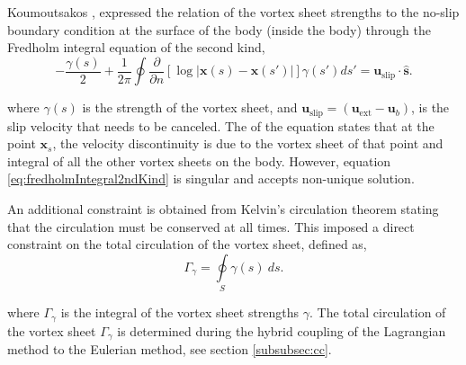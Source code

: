 Koumoutsakos \cite{Koumoutsakos1993b}, expressed the relation of the vortex sheet strengths to the no-slip boundary condition at the surface of the body (inside the body) through the Fredholm integral equation of the second kind,
	\begin{equation}
	-\frac{\gamma\left(s\right)}{2} + \frac{1}{2\pi}\oint\frac{\partial}{\partial n}\left[\log\left|\mathbf{x}\left(s\right)-\mathbf{x}\left(s'\right)\right|\right]\gamma\left(s'\right)ds'= \mathbf{u}_{\mathrm{slip}}\cdot\mathbf{\hat{s}}.
	\label{eq:fredholmIntegral2ndKind}
	\end{equation}

where $\gamma(s)$ is the strength of the vortex sheet, and $\mathbf{u}_{\mathrm{slip}} = (\mathbf{u}_{\mathrm{ext}}-\mathbf{u}_{b})$, is the slip velocity that needs to be canceled. The  of the equation states that at the point $\mathbf{x}_s$, the velocity discontinuity is due to the vortex sheet of that point and integral of all the other vortex sheets on the body. However, equation \ref{eq:fredholmIntegral2ndKind} is singular and accepts non-unique solution. 

An additional constraint is obtained from Kelvin's circulation theorem stating that the circulation must be conserved at all times. This imposed a direct constraint on the total circulation of the vortex sheet, defined as,
	\begin{equation}
	\Gamma_{\gamma} = \oint\limits_S\gamma\left(s\right)\ d s.
	\label{eq:circulationConstraintonPanels}
	\end{equation}

where $\Gamma_{\gamma}$ is the integral of the vortex sheet strengths $\gamma$. The total circulation of the vortex sheet $\Gamma_{\gamma}$ is determined during the hybrid coupling of the Lagrangian method to the Eulerian method, see section \ref{subsubsec:cc}.




